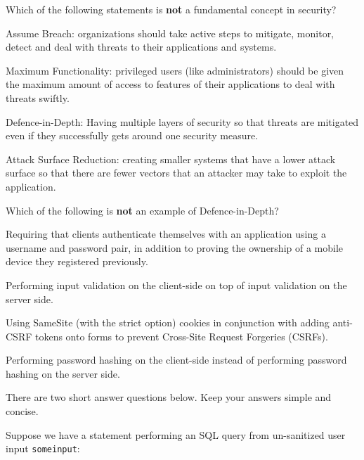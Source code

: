 \documentclass[exam,qn]{yqteach}
\begin{document}
 Which of the following statements is \textbf{not} a fundamental concept in security?
\begin{letteroptions}
    \item Assume Breach: organizations should take active steps to mitigate, monitor, detect and deal with threats to their applications and systems.
    \item Maximum Functionality: privileged users (like administrators) should be given the maximum amount of access to features of their applications to deal with threats swiftly.
    \item Defence-in-Depth: Having multiple layers of security so that threats are mitigated even if they successfully gets around one security measure.
    \item Attack Surface Reduction: creating smaller systems that have a lower attack surface so that there are fewer vectors that an attacker may take to exploit the application.
\end{letteroptions}

 Which of the following is \textbf{not} an example of Defence-in-Depth?
\begin{letteroptions}
    \item Requiring that clients authenticate themselves with an application using a username and password pair, in addition to proving the ownership of a mobile device they registered previously.
    \item Performing input validation on the client-side on top of input validation on the server side.
    \item Using SameSite (with the strict option) cookies in conjunction with adding anti-CSRF tokens onto forms to prevent Cross-Site Request Forgeries (CSRFs).
    \item Performing password hashing on the client-side instead of performing password hashing on the server side.
\end{letteroptions}

There are two short answer questions below. Keep your answers simple and concise.

 Suppose we have a statement performing an SQL query from un-sanitized user input \texttt{someinput}:
\end{document}
